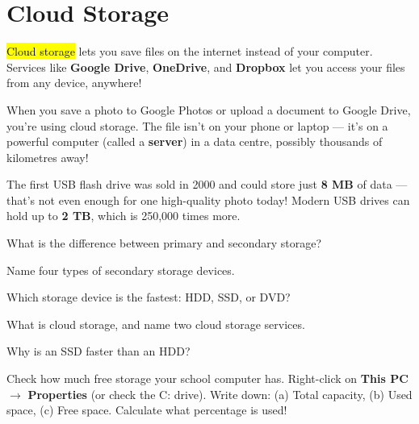 \section{Cloud Storage}
\label{sec:cloud}

\hl{Cloud storage} lets you save files on the internet instead of your computer. Services like \textbf{Google Drive}, \textbf{OneDrive}, and \textbf{Dropbox} let you access your files from any device, anywhere!

\begin{realworld}
When you save a photo to Google Photos or upload a document to Google Drive, you're using cloud storage. The file isn't on your phone or laptop --- it's on a powerful computer (called a \textbf{server}) in a data centre, possibly thousands of kilometres away!
\end{realworld}


\begin{funfact}
The first USB flash drive was sold in 2000 and could store just \textbf{8 MB} of data --- that's not even enough for one high-quality photo today! Modern USB drives can hold up to \textbf{2 TB}, which is 250,000 times more.
\end{funfact}

\begin{reviewqs}
  \item What is the difference between primary and secondary storage?
  \item Name four types of secondary storage devices.
  \item Which storage device is the fastest: HDD, SSD, or DVD?
  \item What is cloud storage, and name two cloud storage services.
  \item Why is an SSD faster than an HDD?
\end{reviewqs}

\begin{challenge}
Check how much free storage your school computer has. Right-click on \textbf{This PC} $\rightarrow$ \textbf{Properties} (or check the C: drive). Write down: (a) Total capacity, (b) Used space, (c) Free space. Calculate what percentage is used!
\end{challenge}

